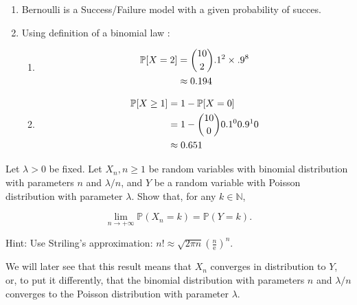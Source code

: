 \begin{solution}
  \begin{enumerate}
    \item Bernoulli is a Success/Failure model with a given probability of succes.
    \item Using definition of a binomial law :
          \begin{enumerate}
            \item \begin{align*}
                    \mathbb{P}[X = 2] & = \binom{10}{2} .1^2 \times .9^8 \\
                                  & \approx 0.194
                  \end{align*}
            \item \begin{align*}
                    \mathbb{P}[X \geq 1] & = 1 - \mathbb{P}[X = 0]              \\
                                     & = 1 - \binom{10}{0} 0.1^0 0.9^10 \\
                                     & \approx 0.651
                  \end{align*}
          \end{enumerate}
  \end{enumerate}
\end{solution}

\begin{Exercise}
  Let $\lambda>0$ be fixed. Let $X_{n}, n \geq 1$ be random variables with binomial distribution with parameters $n$ and $\lambda / n$, and $Y$ be a random variable with Poisson distribution with parameter $\lambda$. Show that, for any $k \in \mathbb{N}$,

  $$
    \lim _{n \rightarrow+\infty} \mathbb{P}\left(X_{n}=k\right)=\mathbb{P}(Y=k) .
  $$

  Hint: Use Striling's approximation: $n ! \approx \sqrt{2 \pi n}\left(\frac{n}{\mathrm{e}}\right)^{n}$.

  We will later see that this result means that $X_{n}$ converges in distribution to $Y$, or, to put it differently, that the binomial distribution with parameters $n$ and $\lambda / n$ converges to the Poisson distribution with parameter $\lambda$.
\end{Exercise}

